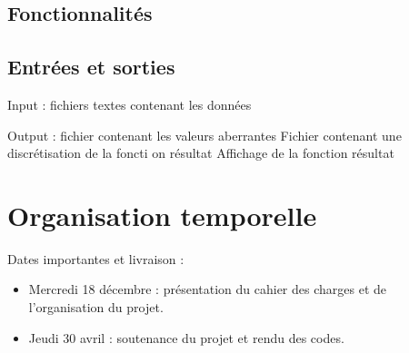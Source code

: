 \documentclass[a4paper,12pt]{article}
\begin{document}
\subsection{Fonctionnalités}
\label{Fonctions}


\subsection{Entrées et sorties}

Input : fichiers textes contenant les données

Output : fichier contenant les valeurs aberrantes
	   Fichier contenant une discrétisation de la foncti on résultat
	   Affichage de la fonction résultat

\newpage
\section{Organisation temporelle}

Dates importantes et livraison :
\begin{itemize}
\item Mercredi 18 décembre : présentation du cahier des charges et de l'organisation du projet.
\item Jeudi 30 avril : soutenance du projet et rendu des codes.
\end{itemize}
\end{document}
